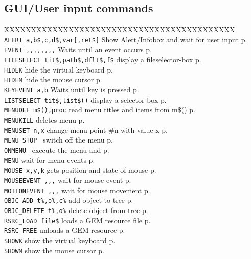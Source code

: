\subsection{GUI/User input commands}
\begin{tabbing}
XXXXXXXXXXXXXXX\=XXXXXXXXXXXXXXXXXXXXXXXXXXXX\=\kill\\
\verb|ALERT a,b$,c,d$,var[,ret$]| \> Show Alert/Infobox and wait for user input\> p.\pageref{ALERT}\\
\verb|EVENT ,,,,,,,,|	 \> Waits until an event occurs\> p.\pageref{EVENT}\\
\verb|FILESELECT tit$,path$,dflt$,f$|  \> display a fileselector-box\> p.\pageref{FILESELECT}\\
\verb|HIDEK|  	         \> hide the virtual keyboard\> p.\pageref{HIDEK}\\
\verb|HIDEM|  	         \> hide the mouse cursor\> p.\pageref{HIDEM}\\
\verb|KEYEVENT a,b|	 \> Waits until key is pressed\> p.\pageref{KEYEVENT}\\
\verb|LISTSELECT tit$,list$()|  \> display a selector-box\> p.\pageref{LISTSELECT}\\

\verb|MENUDEF m$(),proc| \> read menu titles and items from m\$()\> p.\pageref{MENUDEF}\\
\verb|MENUKILL|		 \> deletes menu\> p.\pageref{MENUKILL}\\
\verb|MENUSET n,x|	 \> change menu-point \#n with value x\> p.\pageref{MENUSET}\\
\verb|MENU STOP	|	 \> switch off the menu\> p.\pageref{MENUbSTOP}\\
\verb|ONMENU | 		 \> execute the menu and\> p.\pageref{ONMENU}\\
\verb|MENU|		 \> wait for menu-events\> p.\pageref{MENU}\\
\verb|MOUSE x,y,k|	 \> gets position and state of mouse\> p.\pageref{MOUSE}\\
\verb|MOUSEEVENT ,,,|	 \> wait for mouse event\> p.\pageref{MOUSEEVENT}\\
\verb|MOTIONEVENT ,,,|	 \> wait for mouse movement\> p.\pageref{MOTIONEVENT}\\
\verb|OBJC_ADD t%,o%,c%| \> add object to tree\> p.\pageref{OBJCiADD}\\
\verb|OBJC_DELETE t%,o%| \> delete object from tree\> p.\pageref{OBJCiDELETE}\\
\verb|RSRC_LOAD file$|   \> loads a GEM resource file\> p.\pageref{RSRCiLOAD}\\
\verb|RSRC_FREE|         \> unloads a GEM resource \> p.\pageref{RSRCiFREE}\\
\verb|SHOWK|  	         \> show the virtual keyboard\> p.\pageref{SHOWK}\\
\verb|SHOWM|  	         \> show the mouse cursor\> p.\pageref{SHOWM}\\
\end{tabbing}

